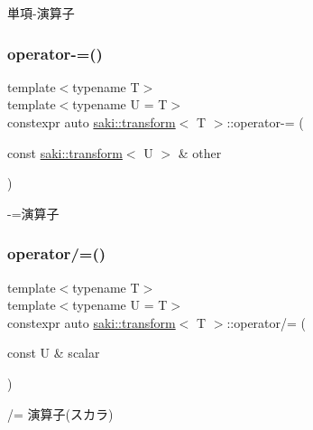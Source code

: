 単項-\/演算子 

\mbox{\label{classsaki_1_1transform_a4ce71c92d3d4944f6773a021d0bd3234}} 
\subsubsection{\texorpdfstring{operator-\/=()}{operator-=()}}
{\footnotesize\ttfamily template$<$typename T$>$ \\
template$<$typename U  = T$>$ \\
constexpr auto \mbox{\hyperlink{classsaki_1_1transform}{saki\+::transform}}$<$ T $>$\+::operator-\/= (\begin{DoxyParamCaption}\item[{const \mbox{\hyperlink{classsaki_1_1transform}{saki\+::transform}}$<$ U $>$ \&}]{other }\end{DoxyParamCaption})\hspace{0.3cm}{\ttfamily [inline]}}



-\/=演算子 

\mbox{\label{classsaki_1_1transform_a069699ce700d7a69503c17c78b58646e}} 
\subsubsection{\texorpdfstring{operator/=()}{operator/=()}}
{\footnotesize\ttfamily template$<$typename T$>$ \\
template$<$typename U  = T$>$ \\
constexpr auto \mbox{\hyperlink{classsaki_1_1transform}{saki\+::transform}}$<$ T $>$\+::operator/= (\begin{DoxyParamCaption}\item[{const U \&}]{scalar }\end{DoxyParamCaption})\hspace{0.3cm}{\ttfamily [inline]}}



/= 演算子(スカラ) 

\mbox{\label{classsaki_1_1transform_a02ae1743b6a54bc004b69b5b9ec3e574}} 
